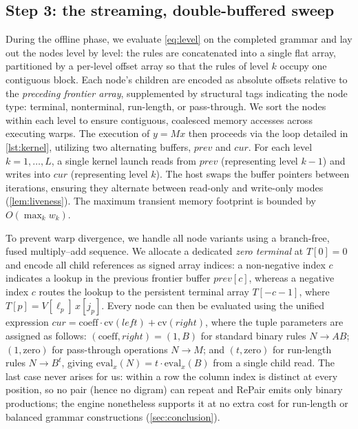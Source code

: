 \documentclass[twoside,leqno,twocolumn]{article}
\begin{document}
\subsection{Step 3: the streaming, double-buffered sweep}
\label{sec:gpu}

During the offline phase, we evaluate \cref{eq:level} on the completed grammar and lay out the nodes level by level: the rules are concatenated into a single flat array, partitioned by a per-level offset array so that the rules of level $k$ occupy one contiguous block. Each node's children are encoded as absolute offsets relative to the \emph{preceding frontier array}, supplemented by structural tags indicating the node type: terminal, nonterminal, run-length, or pass-through. We sort the nodes within each level to ensure contiguous, coalesced memory accesses across executing warps. The execution of $y=Mx$ then proceeds via the loop detailed in \cref{lst:kernel}, utilizing two alternating buffers, $\mathit{prev}$ and $\mathit{cur}$. For each level $k=1,\dots,L$, a single kernel launch reads from $\mathit{prev}$ (representing level $k-1$) and writes into $\mathit{cur}$ (representing level $k$). The host swaps the buffer pointers between iterations, ensuring they alternate between read-only and write-only modes (\cref{lem:liveness}). The maximum transient memory footprint is bounded by $O(\max_k w_k)$.

To prevent warp divergence, we handle all node variants using a branch-free, fused multiply--add sequence. We allocate a dedicated \emph{zero terminal} at $T[0]=0$ and encode all child references as signed array indices: a non-negative index $c$ indicates a lookup in the previous frontier buffer $\mathit{prev}[c]$, whereas a negative index $c$ routes the lookup to the persistent terminal array $T[-c-1]$, where $T[p]=V[\ell_p]\,x[j_p]$. Every node can then be evaluated using the unified expression $\mathit{cur}=\mathrm{coeff}\cdot\mathrm{cv}(\mathit{left})+\mathrm{cv}(\mathit{right})$, where the tuple parameters are assigned as follows: $(\mathrm{coeff},\mathit{right})=(1,B)$ for standard binary rules $N\to AB$; $(1,\text{zero})$ for pass-through operations $N\to M$; and $(t,\text{zero})$ for run-length rules $N\to B^{t}$, giving $\mathrm{eval}_x(N)=t\cdot\mathrm{eval}_x(B)$ from a single child read. The last case never arises for us: within a row the column index is distinct at every position, so no pair (hence no digram) can repeat and RePair emits only binary productions; the engine nonetheless supports it at no extra cost for run-length or balanced grammar constructions (\cref{sec:conclusion}).
\end{document}
